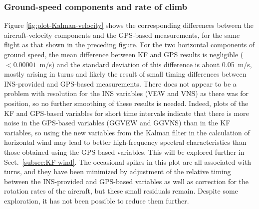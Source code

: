 \documentclass[12pt,twoside,english,12pt,twoside,english]{article}\usepackage[]{graphicx}\usepackage[]{color}
\let\OrgIndex\index
\renewcommand*{\index}[1]{\OrgIndex{#1}}
\begin{document}
\subsubsection{Ground-speed components and rate of climb}

Figure
\ref{fig:plot-Kalman-velocity} shows the corresponding differences
between the aircraft-velocity components
and the GPS-based measurements, for
the same flight as that shown in the preceding figure. For the two
horizontal components of ground speed, the mean difference between
KF and GPS results is negligible ($<0.00001$~m/s) and the standard
deviation of this
difference is about 0.05~m/s, mostly arising
in turns and likely the result of small timing differences between
INS-provided and GPS-based measurements. There does not appear to
be a problem with resolution for
the INS variables (VEW
and VNS) as there was
for position, so no further smoothing of these results is needed.
Indeed, plots of the KF and GPS-based
variables for short time intervals indicate that there is more noise
in the GPS-based variables (GGVEW and GGVNS) than in the KF variables,
so using the new variables from the Kalman filter in the calculation
of horizontal wind may lead to better high-frequency spectral characteristics
than those obtained using the GPS-based variables. This will be explored
further in Sect.~\ref{subsec:KF-wind}. The occasional spikes in
this plot are all associated with turns, and they have been minimized
by adjustment of the relative timing
between the INS-provided and GPS-based variables as well as correction
for the rotation rates of
the aircraft, but these small residuals remain. Despite some exploration,
it has not been possible to reduce them further.
\end{document}
